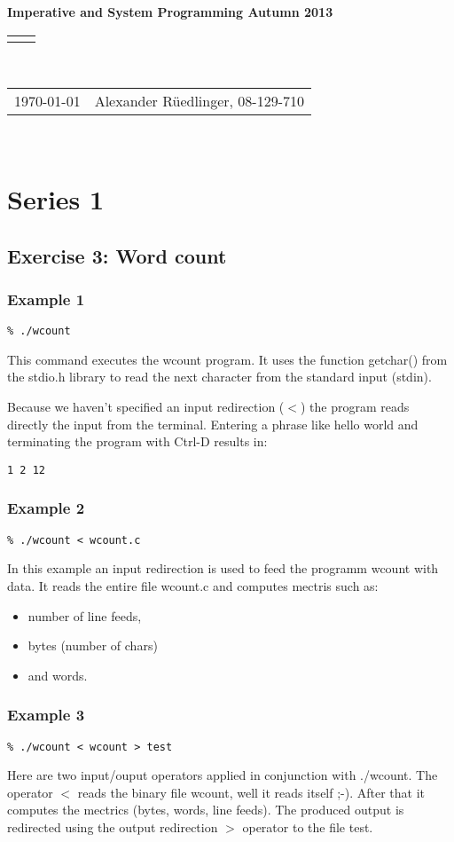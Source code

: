 \documentclass[12pt]{article}
\renewcommand{\title}[1]{\textbf{#1}\\}
\renewcommand{\line}{\begin{tabularx}{\textwidth}{X>{\raggedleft}X}\hline\\\end{tabularx}\\[-0.5cm]}
\newcommand{\leftright}[2]{\begin{tabularx}{\textwidth}{X>{\raggedleft}X}#1%
& #2\\\end{tabularx}\\[-0.5cm]}
\begin{document}
\title{Imperative and System Programming Autumn 2013}
\line
\leftright{\today}{Alexander Rüedlinger, 08-129-710} %
\section*{Series 1}
\subsection*{Exercise 3: Word count}
\subsubsection*{Example 1}
\begin{lstlisting}
% ./wcount
\end{lstlisting}
This command executes the wcount program. It uses the function getchar() from the stdio.h library to read the next character from the standard input (stdin).  
   
Because we haven't specified an input redirection ($<$) the program reads directly the input from the terminal. 
Entering a phrase like hello world and terminating the program with Ctrl-D results in:
\begin{lstlisting}
1 2 12
\end{lstlisting}

\subsubsection*{Example 2}
\begin{lstlisting}
% ./wcount < wcount.c
\end{lstlisting}
In this example an input redirection is used to feed the programm wcount with data.  
It reads the entire file wcount.c and computes mectris such as:
\begin{itemize}
	\item number of line feeds,
	\item bytes (number of chars) 
	\item and words.
\end{itemize}

\subsubsection*{Example 3}
\begin{lstlisting}
% ./wcount < wcount > test
\end{lstlisting}
Here are two input/ouput operators applied in conjunction with ./wcount.  
The operator $<$ reads the binary file wcount, well it reads itself ;-).  
After that it computes the mectrics (bytes, words, line feeds). 
The produced output is redirected using the output redirection $>$ operator to the file test. 
\end{document}
